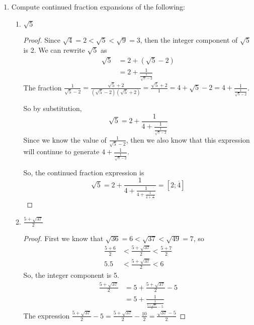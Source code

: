 \documentclass[11pt]{article}
\theoremstyle{definition}
\begin{document}
\begin{enumerate}
\begin{enumerate}
\begin{proof}
        \end{proof}
    
    \end{enumerate}
    \item Compute continued fraction expansions of the following:
    \begin{enumerate}
        \item $\sqrt 5$
        \begin{proof}
            Since $\sqrt{4} = 2 < \sqrt{5} < \sqrt{9} = 3$, 
            then the integer component of $\sqrt{5}$ is 2. We can rewrite 
            $\sqrt{5}$ as
            \begin{align*}
                \sqrt{5} &= 2 + (\sqrt{5} - 2) \\
                &= 2 + \frac{1}{\frac{1}{\sqrt{5} - 2}} 
            \end{align*}
            The fraction $\frac{1}{\sqrt{5} - 2} = \frac{\sqrt{5} + 2}{(\sqrt{5} - 2)(\sqrt{5} + 2)} = \frac{\sqrt{5} + 2}{1} = 4 + \sqrt{5} - 2 = 4 + \frac{1}{\frac{1}{\sqrt{5} - 2}}$.

            So by substitution, 
            \[
                \sqrt{5} = 2 + \frac{1}{4 + \frac{1}{\frac{1}{\sqrt{5} - 2}}}
            \]
            Since we know the value of $\frac{1}{\sqrt{5} - 2}$, then we also know that 
            this expression will continue to generate $4 + \frac{1}{\frac{1}{\sqrt{5} - 2}}$.

            So, the continued fraction expression is 
            \[
                \sqrt{5} = 2 + \frac{1}{4 + \frac{1}{4 + \frac{1}{ 4 + \frac{1}{\dots}}}} = [2; \overline{4}]
            \]
        \end{proof}

        \item $\displaystyle\frac{5+\sqrt{37}}{2}$
        \begin{proof}
            First we know that $\sqrt{36} = 6 < \sqrt{37} < \sqrt{49} = 7$, so 
            \begin{align*}
                \frac{5+6}{2} &< \frac{5+\sqrt{37}}{2} < \frac{5+7}{2} \\
                5.5 &< \frac{5+\sqrt{37}}{2} < 6
            \end{align*}
            So, the integer component is 5.
            \begin{align*}
                \frac{5+\sqrt{37}}{2} &= 5 + \frac{5+\sqrt{37}}{2} - 5 \\
                &= 5 + \frac{1}{\frac{1}{\frac{5+\sqrt{37}}{2} - 5}}
            \end{align*}
            The expression $\frac{5+\sqrt{37}}{2} - 5 = \frac{5+\sqrt{37}}{2} - \frac{10}{2} = \frac{\sqrt{37} - 5}{2}$


\end{proof}
\end{enumerate}
\end{enumerate}
\end{document}
